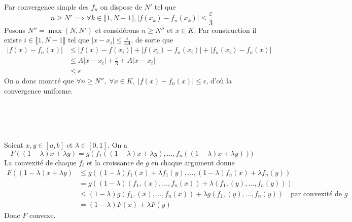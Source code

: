 \documentclass{report}
\begin{document}
Par convergence simple des $f_n$ on dispose de $N'$ tel que $$n\geq N'\implies \forall k\in \llbracket 1,N-1\rrbracket, |f(x_k)-f_n(x_k)|\leq \frac{\varepsilon}{3}$$
Posons $N''=\max(N,N')$ et considérons $n\geq N''$ et $x\in K$.\newline
Par construction il existe $i\in \llbracket 1,N-1\rrbracket$ tel que $|x-x_i|\leq \frac{\varepsilon}{3A}$, de sorte que 
$$\begin{aligned}
|f(x)-f_n(x)|&\leq |f(x)-f(x_i)| + |f(x_i)-f_n(x_i)| + |f_n(x_i)-f_n(x)| \\
&\leq A |x-x_i| + \frac{\varepsilon}{3}  + A |x-x_i|\\
&\leq \epsilon
\end{aligned}$$
On a donc montré que $\forall n\geq N'',\; \forall x\in K, \; |f(x)-f_n(x)|\leq \epsilon$, d'où la convergence uniforme.


\subsection{} \noindent{}\\ 
\\ 
\\
\noindent Soient $x,y\in [a,b]$ et $\lambda\in [0,1]$. On a $$F((1-\lambda)x + \lambda y)=g(f_1((1-\lambda)x + \lambda y),\ldots, f_n((1-\lambda)x + \lambda y))) $$
La convexité de chaque $f_i$ et la croissance de $g$ en chaque argument donne $$\begin{aligned}F((1-\lambda)x + \lambda y)&\leq g((1-\lambda)f_1(x) + \lambda f_1(y),\ldots,(1-\lambda)f_n(x) + \lambda f_n(y)) \\
&=g((1-\lambda) (f_1,(x),\ldots, f_n(x)) + \lambda (f_1,(y),\ldots, f_n(y)) )\\
&\leq (1-\lambda) g(f_1,(x),\ldots, f_n(x)) + \lambda g(f_1,(y),\ldots, f_n(y)) \quad \text{par convexité de } g\\
&= (1-\lambda) F(x) + \lambda F(y)
\end{aligned}
$$
Donc $F$ convexe.
\end{document}

